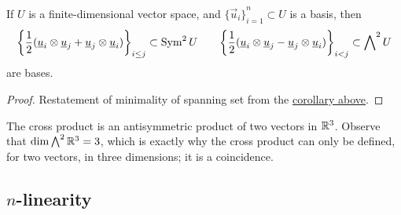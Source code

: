 \begin{corollary}
    If \(U\) is a finite-dimensional vector space,
    and \({\{\vec{u}_i\}}_{i=1}^n \subset U\) is a basis,
    then
    \begin{equation*}
        \Bqty{\frac{1}{2}(\vec{u}_i\otimes\vec{u}_j+\vec{u}_j\otimes\vec{u}_i)}_{i \leq j} \subset \Sym^2 U \qquad
        \Bqty{\frac{1}{2}(\vec{u}_i\otimes\vec{u}_j-\vec{u}_j\otimes\vec{u}_i)}_{i<j} \subset \Asym^2 U
    \end{equation*}
    are bases.
\end{corollary}
\begin{proof}
    Restatement of minimality of spanning set from the
    \hyperref[cor:dim-sym-wedge]{corollary above}.
\end{proof}
\begin{remark}
    The cross product is an antisymmetric product of two vectors in \(\mathbb{R}^3\).
    Observe that \(\dim \operatorname{{\bigwedge}}^2 \mathbb{R}^3 = 3\),
    which is exactly why the cross product can only be defined,
    for two vectors, in three dimensions;
    it is a coincidence.
\end{remark}

\subsection*{\(n\)-linearity}

